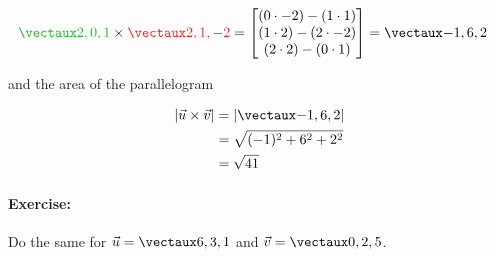 \documentclass{article}
\begin{document}
\begin{align*}
\color{groen} \vect{2,0,1} \color{black} \times \color{rooj} \vect{2,1,-2}\color{black} &= 
\icol{(0\cdot -2) - (1\cdot 1) \\ (1\cdot 2) - (2 \cdot -2) \\ (2 \cdot 2) - (0 \cdot 1)}
=\vect{-1,6,2}
\end{align*}

and the area of the parallelogram

\begin{align*}
|\vec{u}\times \vec{v}| &= |\vect{-1,6,2}|\\
&= \sqrt{(-1)^2+6^2+2^2}\\
&=\sqrt{41}
\end{align*}


\paragraph{Exercise:} Do the same for $\vec{u} = \vect{6,3,1}$ and $\vec{v} = \vect{0,2,5}$.


\end{document}
